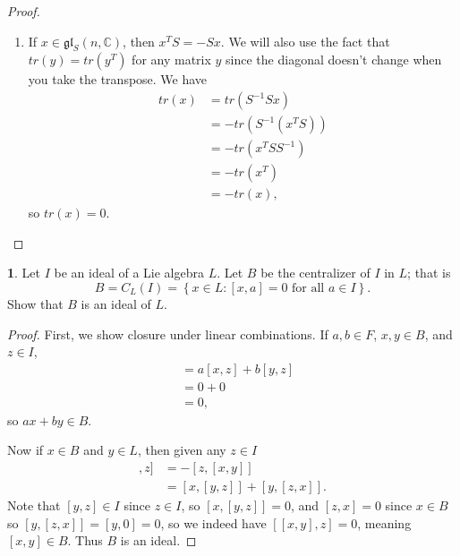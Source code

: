 \documentclass[12pt]{article}
\newcommand{\gl}{\mathfrak{gl}}
\theoremstyle{definition}
\newtheorem{ex}{}
\begin{document}
\begin{proof}
\begin{enumerate}[label=(\alph*)]
\begin{align*}
			             & = \sum_{i=1}^n (BA)_{ii}                 \\
			             & = tr(BA),
		      \end{align*}
		      where the third equality comes not from term-by-term equality as ordered, but from realizing that since we are summing over all $i$ and $j$ between 1 and $n$ inclusive, each term from the sum is represented once in both versions, so we can use commutativity to reorder the sum conveniently to fit our needs.
		\item If $x \in \gl_S(n, \mathbb{C})$, then $x^TS = -Sx$.
		      We will also use the fact that $tr(y) = tr(y^T)$ for any matrix $y$ since the diagonal doesn't change when you take the transpose.
		      We have \begin{align*}
			      tr(x) & = tr(S^{-1}Sx)      \\
			            & = -tr(S^{-1}(x^TS)) \\
			            & = -tr(x^TSS^{-1})   \\
			            & = -tr(x^T)          \\
			            & = -tr(x),
		      \end{align*}
		      so $tr(x) = 0$.
	\end{enumerate}
\end{proof}

\begin{ex}
	Let $I$ be an ideal of a Lie algebra $L$.
	Let $B$ be the centralizer of $I$ in $L$; that is \begin{equation*}
		B = C_L(I) = \left\lbrace x \in L : [x, a] = 0 \text{ for all } a \in I \right\rbrace.
	\end{equation*}
	Show that $B$ is an ideal of $L$.
\end{ex}
\begin{proof}
	First, we show closure under linear combinations.
	If $a, b \in F$, $x, y \in B$, and $z \in I$, \begin{align*}
		[ax + by, z] & = a[x, z] + b[y, z] \\
		             & = 0 + 0             \\
		             & = 0,
	\end{align*}
	so $ax + by \in B$.

	Now if $x \in B$ and $y \in L$, then given any $z \in I$ \begin{align*}
		[[x, y], z] & = -[z, [x, y]]               \\
		            & = [x, [y, z]] + [y, [z, x]].
	\end{align*}
	Note that $[y, z] \in I$ since $z \in I$, so $[x, [y, z]] = 0$, and $[z, x] = 0$ since $x \in B$ so $[y, [z, x]] = [y, 0] = 0$, so we indeed have $[[x,y],z] = 0$, meaning $[x,y] \in B$.
	Thus $B$ is an ideal.
\end{proof}
\end{document}
